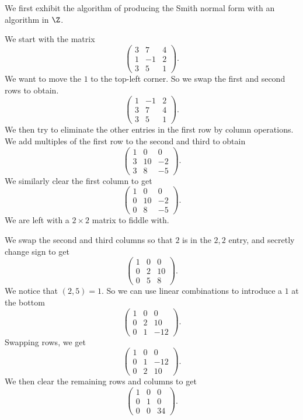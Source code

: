 \documentclass[a4paper]{article}
\begin{document}
We first exhibit the algorithm of producing the Smith normal form with an algorithm in $\Z$.
\begin{eg}
  We start with the matrix
  \[
    \begin{pmatrix}
      3 & 7 & 4\\
      1 & -1 & 2\\
      3 & 5 & 1
    \end{pmatrix}.
  \]
  We want to move the $1$ to the top-left corner. So we swap the first and second rows to obtain.
  \[
    \begin{pmatrix}
      1 & -1 & 2\\
      3 & 7 & 4\\
      3 & 5 & 1
    \end{pmatrix}.
  \]
  We then try to eliminate the other entries in the first row by column operations. We add multiples of the first row to the second and third to obtain
  \[
    \begin{pmatrix}
      1 & 0 & 0\\
      3 & 10 & -2\\
      3 & 8 & -5
    \end{pmatrix}.
  \]
  We similarly clear the first column to get
  \[
    \begin{pmatrix}
      1 & 0 & 0\\
      0 & 10 & -2\\
      0 & 8 & -5
    \end{pmatrix}.
  \]
  We are left with a $2\times 2$ matrix to fiddle with.

  We swap the second and third columns so that $2$ is in the $2, 2$ entry, and secretly change sign to get
  \[
    \begin{pmatrix}
      1 & 0 & 0\\
      0 & 2 & 10\\
      0 & 5 & 8
    \end{pmatrix}.
  \]
  We notice that $(2, 5) = 1$. So we can use linear combinations to introduce a $1$ at the bottom
  \[
    \begin{pmatrix}
      1 & 0 & 0\\
      0 & 2 & 10\\
      0 & 1 & -12
    \end{pmatrix}.
  \]
  Swapping rows, we get
  \[
    \begin{pmatrix}
      1 & 0 & 0\\
      0 & 1 & -12\\
      0 & 2 & 10
    \end{pmatrix}.
  \]
  We then clear the remaining rows and columns to get
  \[
    \begin{pmatrix}
      1 & 0 & 0\\
      0 & 1 & 0\\
      0 & 0 & 34
    \end{pmatrix}.
  \]
\end{eg}
\end{document}
